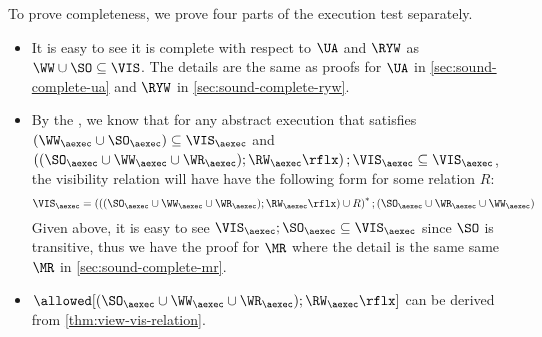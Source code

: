 To prove completeness, we prove four parts of the execution test separately.
\begin{itemize}
\item It is easy to see it is complete with respect to \( \UA \) and \( \RYW \) as \( \WW \cup \SO \subseteq \VIS \).
    The details are the same as proofs for \( \UA \) in \cref{sec:sound-complete-ua} and \( \RYW \) in \cref{sec:sound-complete-ryw}.

\item By the \cite{SIanalysis}, we know that for any abstract execution that satisfies \( (\WW_\aexec \cup \SO_\aexec) \subseteq \VIS_\aexec \)
and \( \left( (\SO_\aexec \cup \WW_\aexec \cup \WR_\aexec ) ; \RW_{\aexec}\rflx \right) ; \VIS_\aexec \subseteq \VIS_\aexec \),
the visibility relation will have have the following form for some relation \( R \):
\[
    \VIS_\aexec = \left( \left( (\SO_\aexec \cup \WW_\aexec \cup \WR_\aexec ) ; \RW_{\aexec}\rflx \right)  \cup R \right)^* ; (\SO_\aexec \cup \WR_\aexec \cup \WW_\aexec) 
\]
Given above, it is easy to see \( \VIS_\aexec ; \SO_\aexec \subseteq \VIS_\aexec \) since \( \SO \) is transitive, 
thus we have the proof for \( \MR \) where the detail is the same same \( \MR \) in \cref{sec:sound-complete-mr}.

\item \( \allowed[(\SO_\aexec \cup \WW_\aexec \cup \WR_\aexec ) ; \RW_{\aexec}\rflx] \) can be derived from \cref{thm:view-vis-relation}.

\end{itemize}
